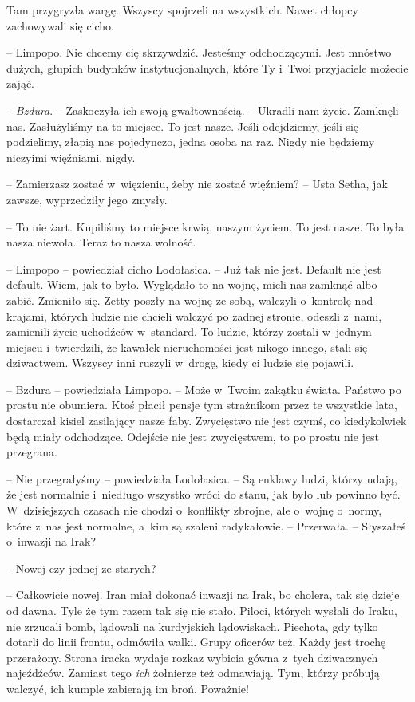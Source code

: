 \documentclass[oneside,polish,11pt,sfheadings]{mwbk}
\begin{document}
Tam przygryzła wargę. Wszyscy spojrzeli na wszystkich. Nawet chłopcy
zachowywali się cicho. 

-- Limpopo. Nie chcemy cię skrzywdzić. Jesteśmy
odchodzącymi. Jest mnóstwo dużych, głupich budynków instytucjonalnych,
które Ty i~Twoi przyjaciele możecie zająć.

-- \textit{Bzdura}. -- Zaskoczyła ich swoją gwałtownością. -- Ukradli nam
życie. Zamknęli nas. Zasłużyliśmy na to miejsce. To jest nasze. Jeśli
odejdziemy, jeśli się podzielimy, złapią nas pojedynczo, jedna osoba na
raz. Nigdy nie będziemy niczyimi więźniami, nigdy.

-- Zamierzasz zostać w~więzieniu, żeby nie zostać więźniem? -- Usta Setha,
jak zawsze, wyprzedziły jego zmysły.

-- To nie żart. Kupiliśmy to miejsce krwią, naszym życiem. To jest nasze.
To była nasza niewola. Teraz to nasza wolność.

-- Limpopo -- powiedział cicho Lodołasica. -- Już tak nie jest. Default nie
jest default. Wiem, jak to było. Wyglądało to na wojnę, mieli nas
zamknąć albo zabić. Zmieniło się. Zetty poszły na wojnę ze sobą,
walczyli o~kontrolę nad krajami, których ludzie nie chcieli walczyć po
żadnej stronie, odeszli z~nami, zamienili życie uchodźców w~standard. To
ludzie, którzy zostali w~jednym miejscu i~twierdzili, że kawałek
nieruchomości jest nikogo innego, stali się dziwactwem. Wszyscy inni
ruszyli w~drogę, kiedy ci ludzie się pojawili.

-- Bzdura -- powiedziała Limpopo. -- Może w~Twoim zakątku świata. Państwo
po prostu nie obumiera. Ktoś płacił pensje tym strażnikom przez te
wszystkie lata, dostarczał kisiel zasilający nasze faby. Zwycięstwo nie
jest czymś, co kiedykolwiek będą miały odchodzące. Odejście nie jest
zwycięstwem, to po prostu nie jest przegrana.

-- Nie przegrałyśmy -- powiedziała Lodołasica. -- Są enklawy ludzi, którzy
udają, że jest normalnie i~niedługo wszystko wróci do stanu, jak było
lub powinno być. W~dzisiejszych czasach nie chodzi o~konflikty zbrojne,
ale o~wojnę o~normy, które z~nas jest normalne, a~kim są szaleni
radykałowie. -- Przerwała. -- Słyszałeś o~inwazji na Irak?

-- Nowej czy jednej ze starych?

-- Całkowicie nowej. Iran miał dokonać inwazji na Irak, bo cholera, tak
się dzieje od dawna. Tyle że tym razem tak się nie stało. Piloci,
których wysłali do Iraku, nie zrzucali bomb, lądowali na kurdyjskich
lądowiskach. Piechota, gdy tylko dotarli do linii frontu, odmówiła
walki. Grupy oficerów też. Każdy jest trochę przerażony. Strona iracka
wydaje rozkaz wybicia gówna z~tych dziwacznych najeźdźców. Zamiast tego
\textit{ich} żołnierze też odmawiają. Tym, którzy próbują walczyć, ich
kumple zabierają im broń. Poważnie!
\end{document}
